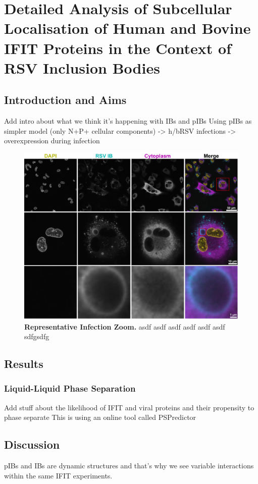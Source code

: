 \chapter{Detailed Analysis of Subcellular Localisation of Human and Bovine IFIT Proteins in the Context of RSV Inclusion Bodies}

\section{Introduction and Aims}
Add intro about what we think it’s happening with IBs and pIBs \newline
Using pIBs as simpler model (only N+P+ cellular components) -> h/bRSV infections -> overexpression during infection

\begin{figure}
    \centering
    \includegraphics[width=1\linewidth]{08. Chapter 3//Figs//01. Introduction/IB-zooms.pdf}
    \caption[Representative Infection Zoom.]{\textbf{Representative Infection Zoom.} asdf asdf asdf asdf asdf asdf sdfgsdfg}
    \label{Representative Infection Zoom}
\end{figure}

\section{Results}




\subsection{Liquid-Liquid Phase Separation} \label{Liquid-Liquid Phase Separation}
Add stuff about the likelihood of IFIT and viral proteins and their propensity to phase separate \newline
This is using an online tool called PSPredictor


\section{Discussion}
pIBs and IBs are dynamic structures and that’s why we see variable interactions within the same IFIT experiments.